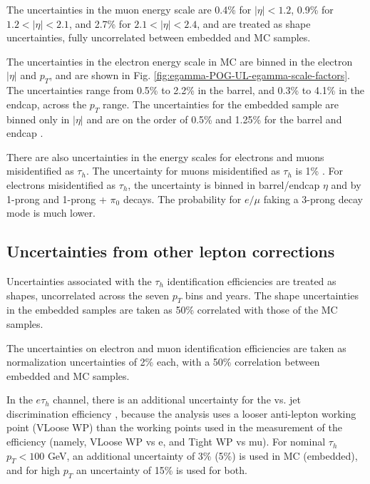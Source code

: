 The uncertainties in the muon energy scale \cite{twiki_MUON_POG_recommendation} are 0.4\% for $|\eta| < 1.2$, 0.9\% for $1.2 < |\eta| < 2.1$, and 2.7\% for $2.1 < |\eta| < 2.4$, and are treated as shape uncertainties, fully uncorrelated between embedded and MC samples.

The uncertainties in the electron energy scale \cite{twiki_Electron_POG_recommendation} in MC are binned in the electron $|\eta|$ and $p_{T}$, and are shown in Fig. \ref{fig:egamma-POG-UL-egamma-scale-factors}. The uncertainties range from 0.5\% to 2.2\% in the barrel, and 0.3\% to 4.1\% in the endcap, across the $p_{T}$ range. The uncertainties for the embedded sample are binned only in $|\eta|$ and are on the order of 0.5\% and 1.25\% for the barrel and endcap \cite{twiki_embedded_preUL_2018}.

There are also uncertainties in the energy scales for electrons and muons misidentified as $\tau_{h}$. The uncertainty for muons misidentified as $\tau_{h}$ is 1\% \cite{twiki_TAU_POG_tauidrecommendationforrun2}. For electrons misidentified as $\tau_{h}$, the uncertainty is binned in barrel/endcap $\eta$ and by 1-prong and 1-prong + $\pi_0$ decays. The probability for $e/\mu$ faking a 3-prong decay mode is much lower. 

\subsection{Uncertainties from other lepton corrections}
Uncertainties associated with the $\tau_{h}$ identification efficiencies are treated as shapes, uncorrelated across the seven $p_{T}$ bins and years. The shape uncertainties in the embedded samples are taken as 50\% correlated with those of the MC samples.

The uncertainties on electron and muon identification efficiencies are taken as normalization uncertainties of 2\% each, with a 50\% correlation between embedded and MC samples.

In the $e\tau_{h}$ channel, there is an additional uncertainty for the vs. jet discrimination efficiency \cite{twiki_TAU_POG_tauidrecommendationforrun2}, because the analysis uses a looser anti-lepton working point (VLoose WP) than the working points used in the measurement of the efficiency (namely, VLoose WP vs e, and Tight WP vs mu). For nominal $\tau_{h}$ $p_{T} < 100$ GeV, an additional uncertainty of 3\% (5\%) is used in MC (embedded), and for high $p_{T}$ an uncertainty of 15\% is used for both.

